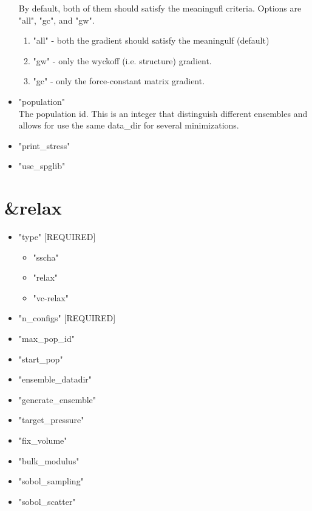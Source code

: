 \documentclass[]{scrartcl}
\begin{document}
\begin{itemize}
 By default, both of them should satisfy the meaningufl criteria.
 Options are "all", "gc", and "gw".
\begin{enumerate}
	\item "all" - both the gradient should satisfy the meaningulf (default)
	\item "gw"  - only the wyckoff (i.e. structure) gradient.
	\item "gc"  - only the force-constant matrix gradient.
\end{enumerate} 
	\item "population"\\
	The population id. This is an integer that distinguish different ensembles and allows for use the same data\_dir for several minimizations.
	\item "print\_stress"
	\item "use\_spglib"
\end{itemize}
\section{\&relax}
\begin{itemize}
	\item "type" [REQUIRED]
	\begin{itemize}
		\item "sscha"
		\item "relax"	
		\item "vc-relax"
	\end{itemize}
	\item "n\_configs" [REQUIRED]
	\item "max\_pop\_id"
	\item "start\_pop"
	\item "ensemble\_datadir"
	\item "generate\_ensemble"
	\item "target\_pressure"
	\item "fix\_volume"
	\item "bulk\_modulus"
	\item "sobol\_sampling"
	\item "sobol\_scatter"
\end{itemize}
\end{document}
